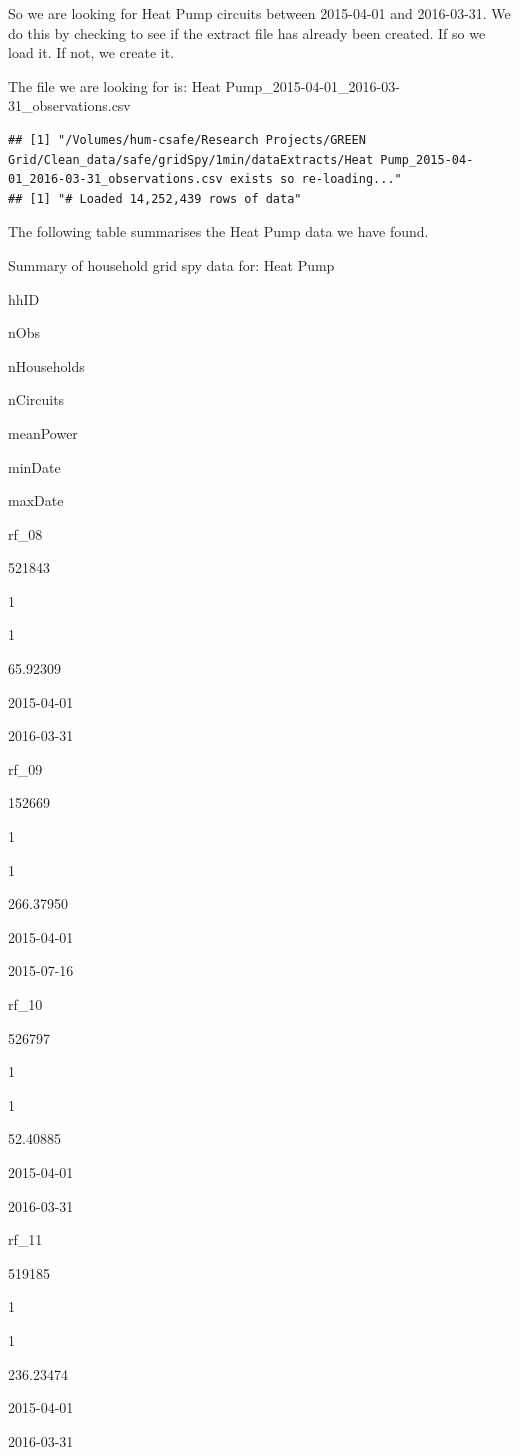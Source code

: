 \documentclass[]{article}
\begin{document}
So we are looking for Heat Pump circuits between 2015-04-01 and
2016-03-31. We do this by checking to see if the extract file has
already been created. If so we load it. If not, we create it.

The file we are looking for is: Heat
Pump\_2015-04-01\_2016-03-31\_observations.csv

\begin{verbatim}
## [1] "/Volumes/hum-csafe/Research Projects/GREEN Grid/Clean_data/safe/gridSpy/1min/dataExtracts/Heat Pump_2015-04-01_2016-03-31_observations.csv exists so re-loading..."
## [1] "# Loaded 14,252,439 rows of data"
\end{verbatim}

The following table summarises the Heat Pump data we have found.

Summary of household grid spy data for: Heat Pump

hhID

nObs

nHouseholds

nCircuits

meanPower

minDate

maxDate

rf\_08

521843

1

1

65.92309

2015-04-01

2016-03-31

rf\_09

152669

1

1

266.37950

2015-04-01

2015-07-16

rf\_10

526797

1

1

52.40885

2015-04-01

2016-03-31

rf\_11

519185

1

1

236.23474

2015-04-01

2016-03-31
\end{document}
